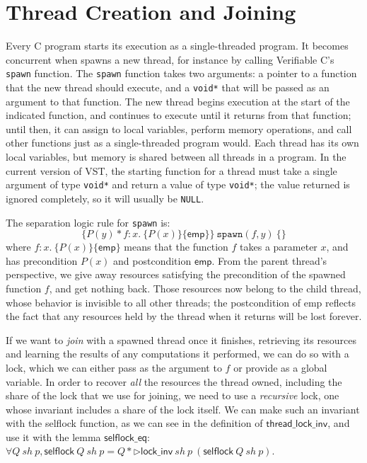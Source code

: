 \documentclass[11pt]{article}
\begin{document}
\section{Thread Creation and Joining}
\label{threads}
Every C program starts its execution as a single-threaded program. It becomes concurrent when spawns a new thread, for instance by calling Verifiable C's \texttt{spawn} function. The \texttt{spawn} function takes two arguments: a pointer to a function that the new thread should execute, and a \texttt{void*} that will be passed as an argument to that function. The new thread begins execution at the start of the indicated function, and continues to execute until it returns from that function; until then, it can assign to local variables, perform memory operations, and call other functions just as a single-threaded program would. Each thread has its own local variables, but memory is shared between all threads in a program. In the current version of VST, the starting function for a thread must take a single argument of type \texttt{void*} and return a value of type \texttt{void*}; the value returned is ignored completely, so it will usually be \texttt{NULL}.

The separation logic rule for \texttt{spawn} is:
$$\{P(y) * f : x.\ \{P(x)\}\{\mathsf{emp}\}\}\ \texttt{spawn}(f, y)\ \{\}$$
where $f : x.\ \{P(x)\}\{\mathsf{emp}\}$ means that the function $f$ takes a parameter $x$, and has precondition $P(x)$ and postcondition $\mathsf{emp}$. From the parent thread's perspective, we give away resources satisfying the precondition of the spawned function $f$, and get nothing back. Those resources now belong to the child thread, whose behavior is invisible to all other threads; the postcondition of \textsf{emp} reflects the fact that any resources held by the thread when it returns will be lost forever.

If we want to \emph{join} with a spawned thread once it finishes, retrieving its resources and learning the results of any computations it performed, we can do so with a lock, which we can either pass as the argument to $f$ or provide as a global variable. In order to recover \emph{all} the resources the thread owned, including the share of the lock that we use for joining, we need to use a \emph{recursive} lock, one whose invariant includes a share of the lock itself. We can make such an invariant with the \textsf{selflock} function, as we can see in the definition of $\mathsf{thread\_lock\_inv}$, and use it with the lemma $\mathsf{selflock\_eq}$: $\forall Q\ \mathit{sh}\ p, \mathsf{selflock}\ Q\ \mathit{sh}\ p = Q * \triangleright \mathsf{lock\_inv}\ \mathit{sh}\ p\ (\mathsf{selflock}\ Q\ \mathit{sh}\ p)$. 
\end{document}
